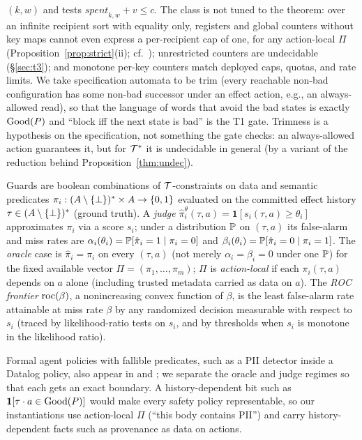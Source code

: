$(k,w)$ and tests $\mathit{spent}_{k,w}+v\le c$. The class is not tuned to the theorem: over an infinite recipient sort
with equality only, registers and global counters without key maps cannot even express a per-recipient
cap of one, for any action-local $\Pi$ (Proposition~\ref{prop:strict}(ii);
cf.~\citep{kaminski1994finite}); unrestricted counters are
undecidable (\S\ref{sec:t3}); and monotone per-key counters match deployed caps, quotas, and
rate limits. We take
specification automata to be trim (every reachable non-bad configuration has some
non-bad successor under an effect action, e.g., an always-allowed read), so that the language of words
that avoid the bad states is exactly $\mathrm{Good}(P)$ and ``block iff the next state is
bad'' is the T1 gate. Trimness is a hypothesis on the specification, not something the gate checks:
an always-allowed action guarantees it, but for $\mathcal{T}^\ast$ it is undecidable in general (by a
variant of the reduction behind Proposition~\ref{thm:undec}).

\begin{definition}\label{def:judge}
Guards are boolean combinations of $\mathcal{T}$-constraints on data and semantic
predicates $\pi_i:(A\setminus\{\bot\})^{*}\times A\to\{0,1\}$ evaluated on
the committed effect history $\tau\in(A\setminus\{\bot\})^{*}$ (ground truth). A \emph{judge}
$\hat\pi_i^{\theta}(\tau,a)=\mathbf{1}[s_i(\tau,a)\ge\theta_i]$ approximates
$\pi_i$ via a score $s_i$; under a distribution $\mathbb{P}$ on $(\tau,a)$ its
false-alarm and miss rates are
$\alpha_i(\theta_i)=\mathbb{P}[\hat\pi_i=1\mid\pi_i=0]$ and
$\beta_i(\theta_i)=\mathbb{P}[\hat\pi_i=0\mid\pi_i=1]$. The \emph{oracle} case is
$\hat\pi_i=\pi_i$ on every $(\tau,a)$ (not merely $\alpha_i=\beta_i=0$ under one $\mathbb{P}$) for the fixed available vector
$\Pi=(\pi_1,\ldots,\pi_m)$; $\Pi$ is \emph{action-local} if each $\pi_i(\tau,a)$ depends on $a$ alone
(including trusted metadata carried as data on $a$). The \emph{ROC frontier} $\mathrm{roc}(\beta)$, a nonincreasing convex function of $\beta$, is the least
false-alarm rate attainable at miss rate $\beta$ by any randomized decision measurable with
respect to $s_i$ (traced by likelihood-ratio tests on $s_i$, and by thresholds when $s_i$ is monotone in
the likelihood ratio).
\end{definition}

Formal agent policies with fallible predicates, such as a PII detector inside a
Datalog policy, also appear in \citet{palumbo2026formal} and
\citet{solkobreslin2026efficient}; we separate the oracle and judge regimes so
that each gets an exact boundary. A history-dependent bit such as
$\mathbf{1}[\tau\cdot a\in\mathrm{Good}(P)]$ would make every safety policy representable, so our
instantiations use action-local $\Pi$ (``this body contains PII'') and carry history-dependent
facts such as provenance as data on actions.


